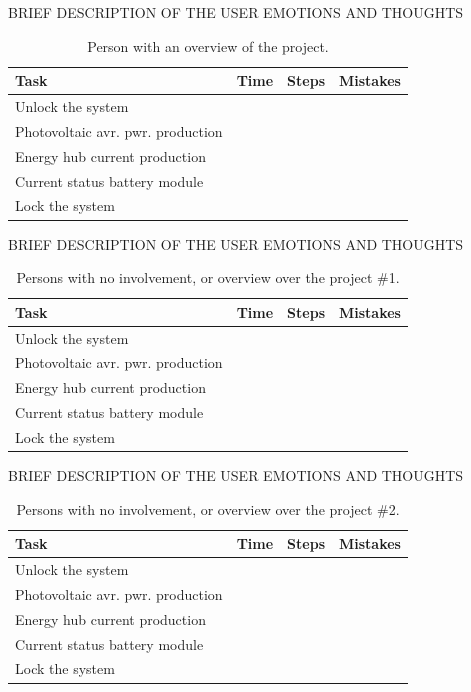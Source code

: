 BRIEF DESCRIPTION OF THE USER EMOTIONS AND THOUGHTS\\

\begin{table}[H]
\begin{tabular}{ | l | l | l | l |}
	\hline
	Task & Time & Steps & Mistakes \\ \hline
	Unlock the system & & & \\ \hline
	Photovoltaic avr. pwr. production & & & \\ \hline
	Energy hub current production & & & \\ \hline
	Current status battery module & & & \\ \hline
	Lock the system & & & \\ \hline
\end{tabular}
\caption{Person with an overview of the project.}
\end{table}

BRIEF DESCRIPTION OF THE USER EMOTIONS AND THOUGHTS\\

\begin{table}[H]
\begin{tabular}{ | l | l | l | l |}
	\hline
	Task & Time & Steps & Mistakes \\ \hline
	Unlock the system & & & \\ \hline
	Photovoltaic avr. pwr. production & & & \\ \hline
	Energy hub current production & & & \\ \hline
	Current status battery module & & & \\ \hline
	Lock the system & & & \\ \hline
\end{tabular}
\caption{Persons with no involvement, or overview over the project \#1.}
\end{table}

BRIEF DESCRIPTION OF THE USER EMOTIONS AND THOUGHTS\\

\begin{table}[H]
\begin{tabular}{ | l | l | l | l |}
	\hline
	Task & Time & Steps & Mistakes \\ \hline
	Unlock the system & & & \\ \hline
	Photovoltaic avr. pwr. production & & & \\ \hline
	Energy hub current production & & & \\ \hline
	Current status battery module & & & \\ \hline
	Lock the system & & & \\ \hline
\end{tabular}
\caption{Persons with no involvement, or overview over the project \#2.}
\end{table}

